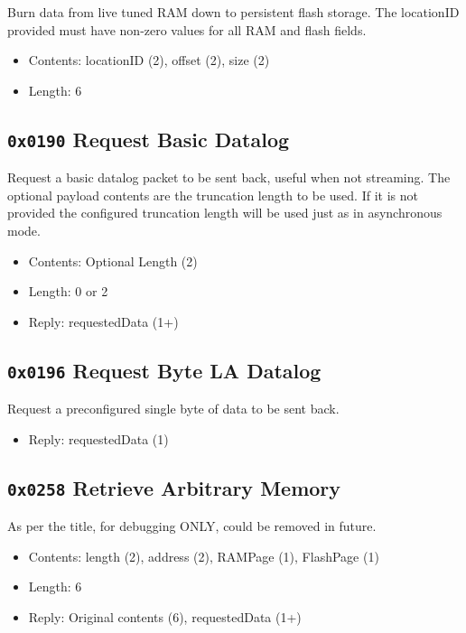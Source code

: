 \documentclass[12pt,a4paper,titlepage]{article}
\begin{document}
\begin{titlepage}
\begin{center}
Burn data from live tuned RAM down to persistent flash storage. The locationID provided must have non-zero values for all RAM and flash fields.

\begin{itemize}
\item Contents: locationID (2),  offset (2), size (2)
\item Length: 6
\end{itemize}


\subsection{\texttt{0x0190} Request Basic Datalog}

Request a basic datalog packet to be sent back, useful when not streaming. The optional payload contents are the truncation length to be used. If it is not provided the configured truncation length will be used just as in asynchronous mode.

\begin{itemize}
\item Contents: Optional Length (2)
\item Length: 0 or 2
\item Reply: requestedData (1+)
\end{itemize}


\subsection{\texttt{0x0196} Request Byte LA Datalog}

Request a preconfigured single byte of data to be sent back.

\begin{itemize}
\item Reply: requestedData (1)
\end{itemize}


\subsection{\texttt{0x0258} Retrieve Arbitrary Memory}

As per the title, for debugging ONLY, could be removed in future.

\begin{itemize}
\item Contents: length (2), address (2), RAMPage (1), FlashPage (1)
\item Length: 6
\item Reply: Original contents (6), requestedData (1+)
\end{itemize}



\end{center}
\end{titlepage}
\end{document}
